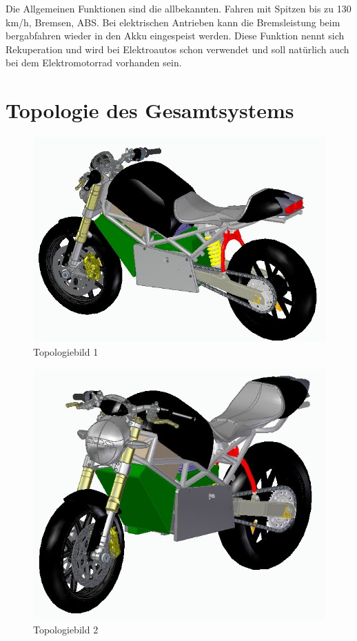 Die Allgemeinen Funktionen sind die allbekannten. Fahren mit Spitzen bis zu 130 km/h, Bremsen, ABS. Bei elektrischen Antrieben kann die Bremsleistung beim bergabfahren wieder in den Akku eingespeist werden. Diese Funktion nennt sich Rekuperation und wird bei Elektroautos schon verwendet und soll natürlich auch bei dem Elektromotorrad vorhanden sein.
\newpage

\section{Topologie des Gesamtsystems}

\begin{figure} [H]
	\begin{center}
		\includegraphics[scale=0.9] {figures/mechanik/Ducati1.jpg}
		\caption{Topologiebild 1}
		\label{fig:Topologiebild 1}
	\end{center}
\end{figure}


\begin{figure} [H]
	\begin{center}
		\includegraphics[scale=0.9] {figures/mechanik/Ducati2.jpg}
		\caption{Topologiebild 2}
		\label{fig:Topologiebild 2}
	\end{center}
\end{figure}

